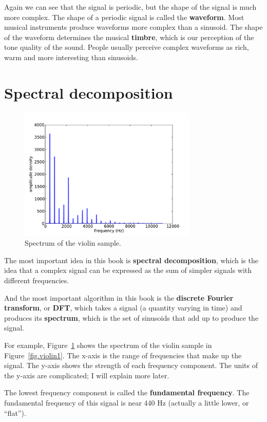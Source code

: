 \documentclass[12pt]{book}
\begin{document}
Again we can see that the signal is periodic, but the shape of the
signal is much more complex.  The shape of a periodic signal is called
the {\bf waveform}.  Most musical instruments produce waveforms more
complex than a sinusoid.  The shape of the waveform determines the
musical {\bf timbre}, which is our perception of the tone quality of the
sound.  People usually perceive complex waveforms as rich, warm and
more interesting than sinusoids.


\section{Spectral decomposition}

\begin{figure}
\centerline{\includegraphics[height=2.5in]{figs/violin2.pdf}}
\caption{Spectrum of the violin sample.}
\label{fig.violin2}
\end{figure}

The most important idea in this book is {\bf spectral decomposition},
which is the idea that a complex signal can be expressed as the sum of
simpler signals with different frequencies.

And the most important algorithm in this book is the {\bf discrete
  Fourier transform}, or {\bf DFT}, which takes a signal (a quantity
varying in time) and produces its {\bf spectrum}, which is the set of
sinusoids that add up to produce the signal.

For example, Figure~\ref{fig.violin2} shows the spectrum of the violin
sample in Figure~\ref{fig.violin1}.  The x-axis is the range of
frequencies that make up the signal.  The y-axis shows the strength of
each frequency component.  The units of the y-axis are complicated;
I will explain more later.

The lowest frequency component is called the {\bf fundamental
  frequency}.  The fundamental frequency of this signal is near 440 Hz
(actually a little lower, or ``flat'').
\end{document}

